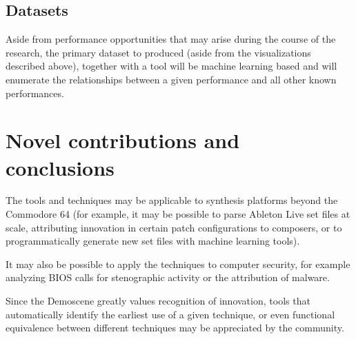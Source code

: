 \documentclass[10pt]{article}
\begin{document}
\begin{multicols*}{2}
  \subsection{Datasets}
  Aside from performance opportunities that may arise during the
  course of the research, the primary dataset to produced (aside from
  the visualizations described above), together with a tool will
  be machine learning based and will enumerate the relationships
  between a given performance and all other known performances.

\section{Novel contributions and conclusions}

The tools and techniques may be applicable to synthesis platforms
beyond the Commodore 64 (for example, it may be possible to parse
Ableton Live set files at scale, attributing innovation in certain
patch configurations to composers, or to programmatically generate new
set files with machine learning tools).

It may also be possible to apply the techniques to computer
security, for example analyzing BIOS calls for stenographic
activity or the attribution of malware.

Since the Demoscene greatly values recognition of innovation, tools
that automatically identify the earliest use of a given technique,
or even functional equivalence between different techniques may
be appreciated by the community.

\clearpage


\end{multicols*}

\nocite{*}


\end{document}
